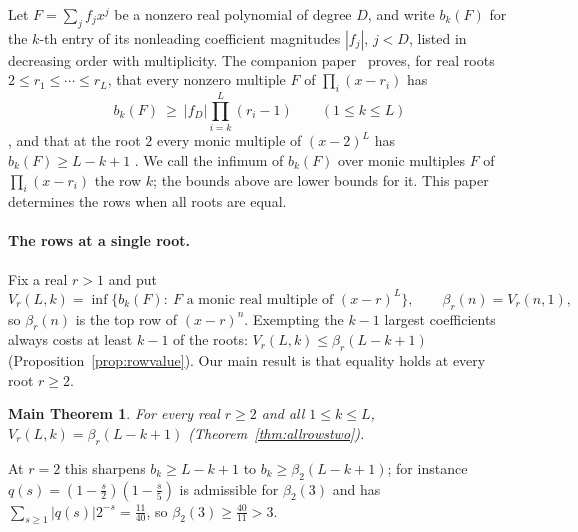 \documentclass[11pt]{article}
\newtheorem*{mainthm}{Main Theorem}
\begin{document}
Let $F=\sum_jf_jx^j$ be a nonzero real polynomial of degree $D$, and write
$b_k(F)$ for the $k$-th entry of its nonleading coefficient magnitudes
$|f_j|$, $j<D$, listed in decreasing order with multiplicity.  The companion
paper~\cite{coefficient-mass} proves, for real
roots $2\le r_1\le\cdots\le r_L$, that every nonzero multiple $F$ of
$\prod_i(x-r_i)$ has
\[
  b_k(F)\ \ge\ |f_D|\prod_{i=k}^L(r_i-1)\qquad(1\le k\le L)
\]
\cite[Theorem~3.2]{coefficient-mass}, and that at the root $2$ every monic
multiple of $(x-2)^L$ has $b_k(F)\ge L-k+1$
\cite[Theorem~4.13]{coefficient-mass}.  We call the infimum of
$b_k(F)$ over monic multiples $F$ of $\prod_i(x-r_i)$ the row $k$; the bounds
above are lower bounds for it.  This paper determines the rows when all
roots are equal.

\paragraph{The rows at a single root.}
Fix a real $r>1$ and put
\[
  V_r(L,k)=\inf\{b_k(F):\ F\text{ a monic real multiple of }(x-r)^L\},
  \qquad \beta_r(n)=V_r(n,1),
\]
so $\beta_r(n)$ is the top row of $(x-r)^n$.  Exempting the $k-1$ largest
coefficients always costs at least $k-1$ of the roots:
$V_r(L,k)\le\beta_r(L-k+1)$ (Proposition~\ref{prop:rowvalue}).  Our main result is that equality holds
at every root $r\ge2$.

\begin{mainthm}
For every real $r\ge2$ and all $1\le k\le L$,
$V_r(L,k)=\beta_r(L-k+1)$ (Theorem~\ref{thm:allrowstwo}).
\end{mainthm}

At $r=2$ this sharpens $b_k\ge L-k+1$ to $b_k\ge\beta_2(L-k+1)$; for instance
$q(s)=(1-\frac s2)(1-\frac s5)$ is admissible for $\beta_2(3)$ and has
$\sum_{s\ge1}|q(s)|2^{-s}=\frac{11}{40}$, so
$\beta_2(3)\ge\frac{40}{11}>3$.
\end{document}
